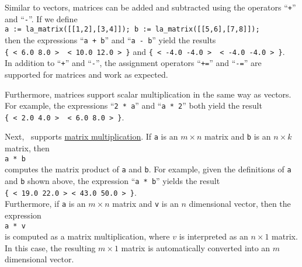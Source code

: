 Similar to vectors, matrices can be added and subtracted using the operators ``\texttt{+}'' and
``\texttt{-}''.   If we define
\\[0.2cm]
\hspace*{1.3cm}
\texttt{a := la\_matrix([[1,2],[3,4]]);   b := la\_matrix([[5,6],[7,8]]);}   
\\[0.2cm]
then the expressions ``\texttt{a + b}'' and ``\texttt{a - b}'' yield the results
\\[0.2cm]
\hspace*{1.3cm}
\texttt{\{ < 6.0  8.0 > \ < 10.0  12.0 > \}} \quad and \quad \texttt{\{ < -4.0  -4.0 > \ < -4.0  -4.0 > \}}.
\\[0.2cm]
In addition to ``\texttt{+}'' and ``\texttt{-}'', the assignment operators ``\texttt{+=}'' and
``\texttt{-=}'' are supported for matrices and work as expected.

Furthermore, matrices support scalar multiplication in the same way as vectors.  For example, the
expressions 
``\texttt{2 * a}'' and ``\texttt{a * 2}'' both yield the result
\\[0.2cm]
\hspace*{1.3cm}
\texttt{\{ < 2.0  4.0 > \ < 6.0  8.0 > \}}.
\vspace*{0.2cm} 

Next,
\setlx\ supports \href{http://en.wikipedia.org/wiki/Matrix_multiplication}{matrix multiplication}.
If \texttt{a} is an $m \times n$ matrix and \texttt{b} is an $n \times k$ matrix, then
\\[0.2cm]
\hspace*{1.3cm}
\texttt{a * b}
\\[0.2cm]
computes the matrix product of \texttt{a} and \texttt{b}.  For example, given the definitions of
\texttt{a} and \texttt{b} shown above,  the expression ``\texttt{a * b}'' yields the result
\\[0.2cm]
\hspace*{1.3cm}
\texttt{\{ < 19.0  22.0 >  < 43.0  50.0 > \}}.
\\[0.2cm]
Furthermore, if \texttt{a} is an $m \times n$ matrix and \texttt{v} is an $n$ dimensional vector,
then the expression 
\\[0.2cm]
\hspace*{1.3cm}
\texttt{a * v}
\\[0.2cm]
is computed as a matrix multiplication, where $v$ is interpreted as an $n \times 1$ matrix.  In
this case, the resulting $m \times 1$ matrix is automatically converted into an $m$ dimensional vector.

